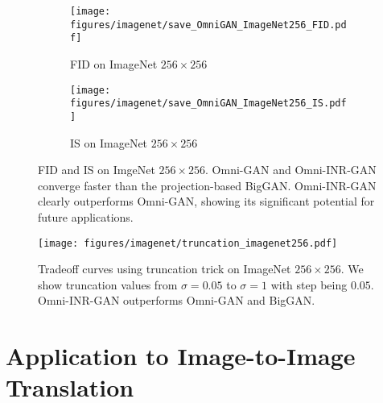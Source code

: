 \documentclass[paper_2425.tex]{subfiles}
\begin{document}
\begin{figure}[t]
\centering
\begin{subfigure}{0.49\linewidth}
    \centering
    \texttt{[image: figures/imagenet/save\_OmniGAN\_ImageNet256\_FID.pdf]}
    \caption{FID on ImageNet $256\times256$}
  \end{subfigure}
  \begin{subfigure}{0.49\linewidth}
    \centering
    \texttt{[image: figures/imagenet/save\_OmniGAN\_ImageNet256\_IS.pdf]}
    \caption{IS on ImageNet $256\times256$}
  \end{subfigure}
  \vspace{-0.2cm}
  \caption{FID and IS on ImgeNet $256\times256$. Omni-GAN and Omni-INR-GAN converge faster than the projection-based BigGAN. Omni-INR-GAN clearly outperforms Omni-GAN, showing its significant potential for future applications.}
  \label{apx:fig:imagenet256}
\end{figure}

\begin{figure}[t]
  \centering
  \centering
  \texttt{[image: figures/imagenet/truncation\_imagenet256.pdf]}
  \caption{Tradeoff curves using truncation trick on ImageNet $256\times256$. We show truncation values from $\sigma=0.05$ to $\sigma=1$ with step being $0.05$. Omni-INR-GAN outperforms Omni-GAN and BigGAN.}
  \label{apx:fig:truncation_imagenet256.}
\end{figure}


\section{Application to Image-to-Image Translation}
\label{apx:sec:imagetoimage}
\end{document}
